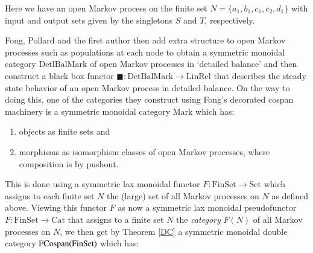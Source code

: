 \documentclass{amsart}
\begin{document}
Here we have an open Markov process on the finite set $N = \{a_1,b_1,c_1,c_2,d_1 \}$ with input and output sets given by the singletons $S$ and $T$, respectively.

Fong, Pollard and the first author then add extra structure to open Markov processes such as populations at each node to obtain a symmetric monoidal category $\mathrm{DetlBalMark}$ of open Markov processes in `detailed balance' and then construct a black box functor $\blacksquare \colon \mathrm{DetBalMark} \to \mathrm{LinRel}$ that describes the steady state behavior of an open Markov process in detailed balance. On the way to doing this, one of the categories they construct using Fong's decorated cospan machinery is a symmetric monoidal category $\mathrm{Mark}$ which has:
\begin{enumerate}
\item{objects as finite sets and}
\item{morphisms as isomorphism classes of open Markov processes, where composition is by pushout.}
\end{enumerate}
This is done using a symmetric lax monoidal functor $F \colon \mathrm{FinSet} \to \mathrm{Set}$ which assigns to each finite set $N$ the (large) set of all Markov processes on $N$ as defined above. Viewing this functor $F$ as now a symmetric lax monoidal pseudofunctor $F \colon \mathrm{FinSet} \to \mathrm{Cat}$ that assigns to a finite set $N$ the \emph{category} $F(N)$ of all Markov processes on $N$, we then get by Theorem \ref{DC} a symmetric monoidal double category $\mathbb{F}\textnormal{Cospan}(\mathrm{FinSet})$ which has:
\end{document}
